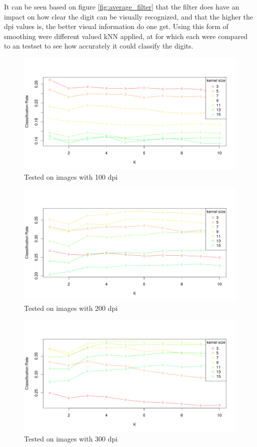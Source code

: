 It can be seen based on figure \ref{fig:average_filter} that the
 filter does have an impact on how clear the digit can be visually
 recognized, and that the higher the dpi values is,
  the better visual information do one get. 
Using this form of smoothing were different valued kNN applied,
at for which each were compared to an testset to see how accurately it could classify the digits. 

\begin{figure}[H]
	\centering
		\includegraphics[width = \textwidth]{Figure/data_100_15_10.png}
		\caption{Tested on images with 100 dpi}
		\label{fig:data_100}
\end{figure}

\begin{figure}[H]
	\centering	
		\includegraphics[width = \textwidth]{Figure/data_200_15_10.png}
		\caption{Tested on images with 200 dpi}
		\label{fig:data_200}
\end{figure}

\begin{figure}[H]
	\centering
		\includegraphics[width = \textwidth]{Figure/data_300_15_10.png}
		\caption{Tested on images with 300 dpi}
		\label{fig:data_300}
\end{figure}

